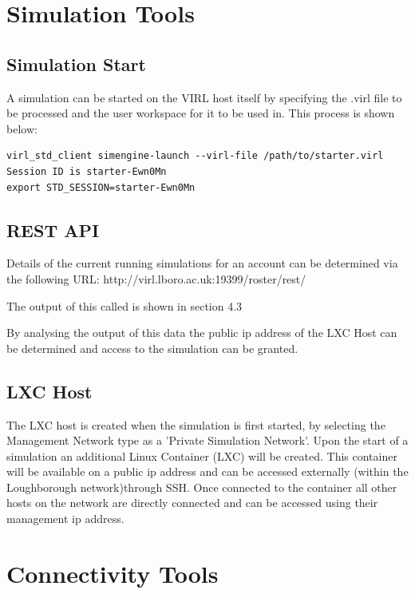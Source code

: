 \documentclass[11pt]{report}
\begin{document}
\section*{Simulation Tools}

\subsection*{Simulation Start}

A simulation can be started on the VIRL host itself by specifying the .virl file to be processed and the user workspace for it to be used in. This process is shown below:

\begin{lstlisting}
virl_std_client simengine-launch --virl-file /path/to/starter.virl
Session ID is starter-Ewn0Mn
export STD_SESSION=starter-Ewn0Mn
\end{lstlisting}

\subsection*{REST API}

Details of the current running simulations for an account can be determined via the following URL: http://virl.lboro.ac.uk:19399/roster/rest/

The output of this called is shown in section 4.3

By analysing the output of this data the public ip address of the LXC Host can be determined and access to the simulation can be granted.

\subsection*{LXC Host}

The LXC host is created when the simulation is first started, by selecting the Management Network type as a 'Private Simulation Network'. Upon the start of a simulation an additional Linux Container (LXC) will be created. This container will be available on a public ip address and can be accessed externally (within the Loughborough network)through SSH. Once connected to the container all other hosts on the network are directly connected and can be accessed using their management ip address.

\section*{Connectivity Tools}
\end{document}
